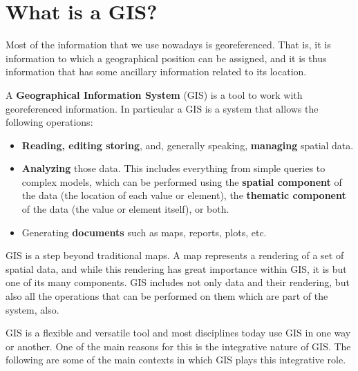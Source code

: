
\chapter{What is a GIS?}

\pagestyle{fancy}

Most of the information that we use nowadays is georeferenced. That is, it is information to which a geographical position can be assigned, and it is thus information that has some ancillary information related to its location.

A \textbf{Geographical Information System} (GIS) is a tool to work with georeferenced information. In particular a GIS is a system that allows the following operations:

\begin{itemize}
	\item \textbf{Reading, editing storing}, and, generally speaking, \textbf{ma\-na\-ging} spatial data.
	\item \textbf{Analyzing} those data. This includes everything from simple queries to complex models, which can be performed using the \textbf{spatial component} of the data (the location of each value or element), the \textbf{thematic component} of the data (the value or element itself), or both.
	\item Generating \textbf{documents} such as maps, reports, plots, etc.
\end{itemize}


GIS is a step beyond traditional maps. A map represents a rendering of a set of spatial data, and while this rendering has great importance within GIS, it is but one of its many components. GIS includes not only data and their rendering, but also all the operations that can be performed on them which are part of the system, also.

GIS is a flexible and versatile tool and most disciplines today use GIS in one way or another. One of the main reasons for this is the integrative nature of GIS. The following are some of the main contexts in which GIS plays this integrative role.


